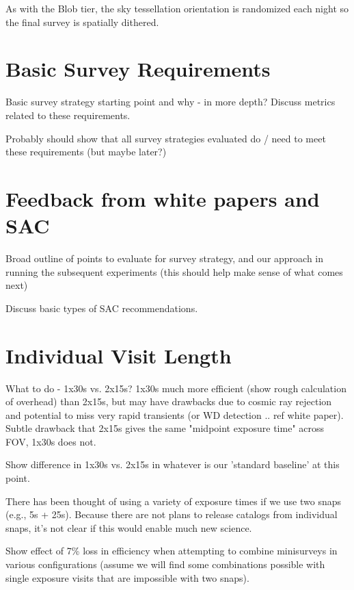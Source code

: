 As with the Blob tier, the sky tessellation orientation is randomized each night so the final survey is spatially dithered. 


\section{Basic Survey Requirements}
Basic survey strategy starting point and why - in more depth? Discuss metrics related to these requirements. 

Probably should show that all survey strategies evaluated do / need to meet these requirements (but maybe later?)

\section{Feedback from white papers and SAC} 
Broad outline of points to evaluate for survey strategy, and our approach in running the subsequent experiments (this should help make sense of what comes next)

Discuss basic types of SAC recommendations. 








\section{Individual Visit Length}
What to do - 1x30s vs. 2x15s? 1x30s much more efficient (show rough calculation of overhead) than 2x15s, but may have drawbacks due to cosmic ray rejection and potential to miss very rapid transients (or WD detection .. ref white paper). Subtle drawback that 2x15s gives the same "midpoint exposure time" across FOV, 1x30s does not. 

Show difference in 1x30s vs. 2x15s in whatever is our 'standard baseline' at this point. 

There has been thought of using a variety of exposure times if we use two snaps (e.g., 5s + 25s). Because there are not plans to release catalogs from individual snaps, it's not clear if this would enable much new science.

Show effect of 7\% loss in efficiency when attempting to combine minisurveys in various configurations (assume we will find some combinations possible with single exposure visits that are impossible with two snaps). 

